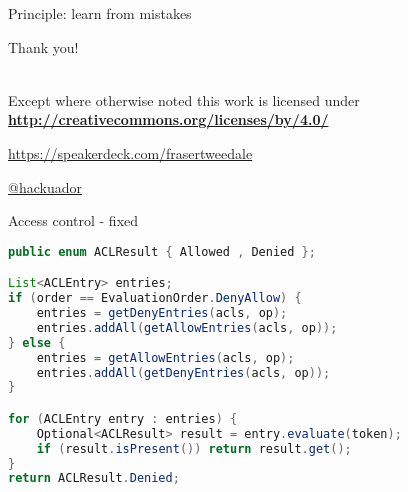 \documentclass[ignorenonframetext,aspectratio=169,dvipsnames]{beamer}
\begin{document}
\begin{frame}[plain]
\huge
Principle: learn from mistakes
\end{frame}





\begin{frame}[plain]

    \hypersetup{urlcolor=black}

    \setlength{\parskip}{.5em}

    { \centering

    {\Huge Thank you!}
    \bigskip
    \bigskip

    
    \\
    { \scriptsize
    Except where otherwise noted this work is licensed under
    }\\
    { \footnotesize
      \textbf{\url{http://creativecommons.org/licenses/by/4.0/}}
    }

    \bigskip
    \large \tt

    \url{https://speakerdeck.com/frasertweedale}

    \href{https://twitter.com/hackuador}{@hackuador}

    }

\end{frame}









\begin{frame}[fragile]{Access control - fixed}
\begin{lstlisting}[language=Java]
public enum ACLResult { Allowed , Denied };

List<ACLEntry> entries;
if (order == EvaluationOrder.DenyAllow) {
    entries = getDenyEntries(acls, op);
    entries.addAll(getAllowEntries(acls, op));
} else {
    entries = getAllowEntries(acls, op);
    entries.addAll(getDenyEntries(acls, op));
}

for (ACLEntry entry : entries) {
    Optional<ACLResult> result = entry.evaluate(token);
    if (result.isPresent()) return result.get();
}
return ACLResult.Denied;
\end{lstlisting}
\end{frame}
\end{document}

